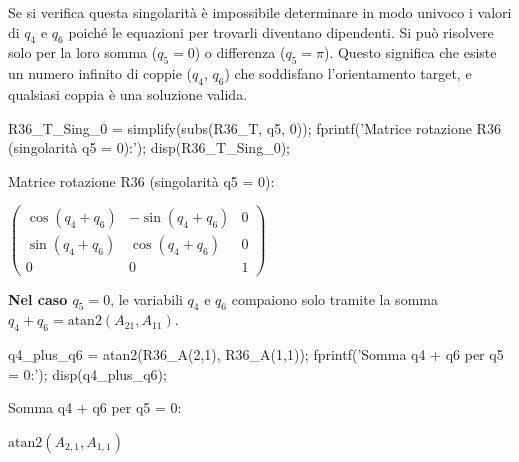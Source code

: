 \documentclass[11pt, a4paper]{article}
\begin{document}
\begin{par}
\begin{flushleft}
Se si verifica questa singolarità è impossibile determinare in modo univoco i valori di $q_4$ e $q_6$ poiché le equazioni per trovarli diventano dipendenti. Si può risolvere solo per la loro somma ($q_5 =0$) o differenza ($q_5 =\pi$). Questo significa che esiste un numero infinito di coppie ($q_4$, $q_6$) che soddisfano l'orientamento target, e qualsiasi coppia è una soluzione valida.
\end{flushleft}
\end{par}

\begin{matlabcode}
R36_T_Sing_0 = simplify(subs(R36_T, q5, 0));
fprintf('Matrice rotazione R36 (singolarità q5 = 0):');
disp(R36_T_Sing_0);
\end{matlabcode}
\begin{matlaboutput}
Matrice rotazione R36 (singolarità q5 = 0):
\end{matlaboutput}
\begin{matlabsymbolicoutput}
$\displaystyle \left(\begin{array}{ccc}
\cos \left(q_4 +q_6 \right) & -\sin \left(q_4 +q_6 \right) & 0\\
\sin \left(q_4 +q_6 \right) & \cos \left(q_4 +q_6 \right) & 0\\
0 & 0 & 1
\end{array}\right)$
\end{matlabsymbolicoutput}
\begin{par}
\begin{flushleft}
\textbf{Nel caso $q_5 =0$}, le variabili $q_4$ e $q_6$ compaiono solo tramite la somma $q_4 +q_6 =\textrm{atan2}(A_{21} ,A_{11} )$.
\end{flushleft}
\end{par}

\begin{matlabcode}
q4_plus_q6 = atan2(R36_A(2,1), R36_A(1,1));
fprintf('Somma q4 + q6 per q5 = 0:\n');
disp(q4_plus_q6);
\end{matlabcode}
\begin{matlaboutput}
Somma q4 + q6 per q5 = 0:
\end{matlaboutput}
\begin{matlabsymbolicoutput}
$\displaystyle \textrm{atan2}\left(A_{2,1} ,A_{1,1} \right)$
\end{matlabsymbolicoutput}
\end{document}
